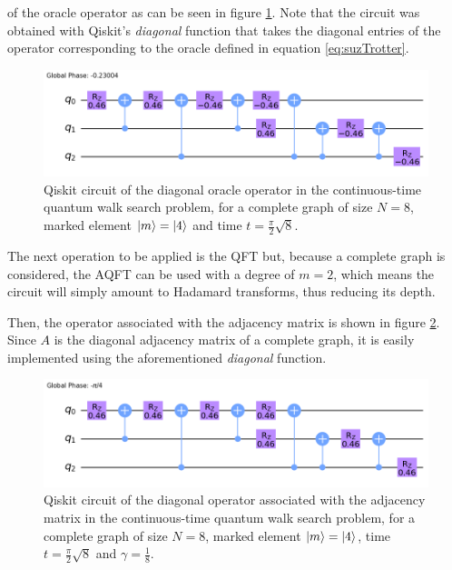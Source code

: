 \documentclass[../../dissertation.tex]{subfiles}
\begin{document}
of the oracle operator as can be seen in figure
\ref{fig:contSearchOracleCircQistkit}. Note that the circuit was obtained with Qiskit's \textit{diagonal} function that takes the diagonal entries of
the operator corresponding to the oracle defined in equation
\eqref{eq:suzTrotter}. 
\begin{figure}[!h]
	\centering
	\includegraphics[scale=0.30]{img/Qiskit/ContQuantumWalk/Search/Circuits/circOracle_N3_S2.png}
	\caption{Qiskit circuit of the  diagonal oracle operator in the continuous-time quantum walk search problem, for a complete graph of size $N=8$, marked element $\ket{m}=\ket{4}$ and time $t=\frac{\pi}{2} \sqrt{8}$.}
	\label{fig:contSearchOracleCircQistkit}
\end{figure}\par

The next operation to be applied is the QFT but, because a
complete graph is considered, the AQFT can be used with a degree of $m=2$,
which means the circuit will simply amount to Hadamard transforms, thus reducing
its depth.\par

Then, the operator associated with the adjacency matrix is shown in figure
\ref{fig:contSearchAdjCircQistkit}. Since $A$ is the diagonal adjacency matrix
of a complete graph, it is easily implemented using the aforementioned
\textit{diagonal} function.
\begin{figure}[!h]
	\centering
	\includegraphics[scale=0.30]{img/Qiskit/ContQuantumWalk/Search/Circuits/circAjd_N3_S2.png}
	\caption{Qiskit circuit of the  diagonal operator associated with the adjacency matrix in the continuous-time quantum walk search problem, for a complete graph of size $N=8$, marked element $\ket{m}=\ket{4}$, time $t=\frac{\pi}{2} \sqrt{8}$ and $\gamma = \frac{1}{8}$.}
	\label{fig:contSearchAdjCircQistkit}
\end{figure}\par
\end{document}
